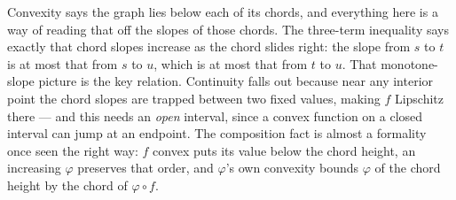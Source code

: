 \documentclass[main.tex]{subfiles}
\begin{document}
\begin{Reflection}
Convexity says the graph lies below each of its chords, and everything here is a way of reading that off the slopes of those chords. The three-term inequality says exactly that chord slopes increase as the chord slides right: the slope from $s$ to $t$ is at most that from $s$ to $u$, which is at most that from $t$ to $u$. That monotone-slope picture is the key relation. Continuity falls out because near any interior point the chord slopes are trapped between two fixed values, making $f$ Lipschitz there --- and this needs an \emph{open} interval, since a convex function on a closed interval can jump at an endpoint. The composition fact is almost a formality once seen the right way: $f$ convex puts its value below the chord height, an increasing $\varphi$ preserves that order, and $\varphi$'s own convexity bounds $\varphi$ of the chord height by the chord of $\varphi \circ f$.
\end{Reflection}
\end{document}
